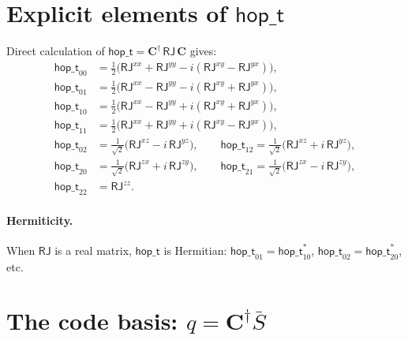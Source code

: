 \documentclass[11pt]{article}
\newcommand{\hop}{\mathsf{hop\_t}}
\newcommand{\dg}{^\dagger}
\begin{document}
\section{Explicit elements of $\hop$}

Direct calculation of $\hop = \mathbf{C}\dg\,\mathsf{RJ}\,\mathbf{C}$ gives:
\begin{align}
  \hop_{00} &= \tfrac{1}{2}\bigl(
    \mathsf{RJ}^{xx} + \mathsf{RJ}^{yy}
    - i(\mathsf{RJ}^{xy} - \mathsf{RJ}^{yx})\bigr),
  \label{eq:hopt00}\\
  \hop_{01} &= \tfrac{1}{2}\bigl(
    \mathsf{RJ}^{xx} - \mathsf{RJ}^{yy}
    - i(\mathsf{RJ}^{xy} + \mathsf{RJ}^{yx})\bigr),
  \label{eq:hopt01}\\
  \hop_{10} &= \tfrac{1}{2}\bigl(
    \mathsf{RJ}^{xx} - \mathsf{RJ}^{yy}
    + i(\mathsf{RJ}^{xy} + \mathsf{RJ}^{yx})\bigr),
  \label{eq:hopt10}\\
  \hop_{11} &= \tfrac{1}{2}\bigl(
    \mathsf{RJ}^{xx} + \mathsf{RJ}^{yy}
    + i(\mathsf{RJ}^{xy} - \mathsf{RJ}^{yx})\bigr),
  \label{eq:hopt11}\\[4pt]
  \hop_{02} &= \tfrac{1}{\sqrt{2}}\bigl(
    \mathsf{RJ}^{xz} - i\,\mathsf{RJ}^{yz}\bigr),
  \qquad
  \hop_{12} = \tfrac{1}{\sqrt{2}}\bigl(
    \mathsf{RJ}^{xz} + i\,\mathsf{RJ}^{yz}\bigr),
  \label{eq:hopt_col2}\\
  \hop_{20} &= \tfrac{1}{\sqrt{2}}\bigl(
    \mathsf{RJ}^{zx} + i\,\mathsf{RJ}^{zy}\bigr),
  \qquad
  \hop_{21} = \tfrac{1}{\sqrt{2}}\bigl(
    \mathsf{RJ}^{zx} - i\,\mathsf{RJ}^{zy}\bigr),
  \label{eq:hopt_row2}\\
  \hop_{22} &= \mathsf{RJ}^{zz}.
\end{align}

\paragraph{Hermiticity.}
When $\mathsf{RJ}$ is a real matrix, $\hop$ is Hermitian:
$\hop_{01} = \hop_{10}^*$, $\hop_{02} = \hop_{20}^*$, etc.


\section{The code basis: $q = \mathbf{C}\dg \bar{S}$}
\end{document}
